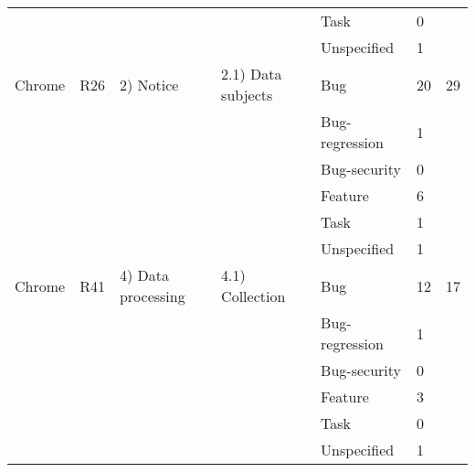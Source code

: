 \documentclass{article}
\begin{document}
\begin{table}[ht]
{\begin{tabular}{|l|l|l|l|l|l|l|}
		~ & ~ & ~ & ~ & Task & 0 & ~ \\ 
		~ & ~ & ~ & ~ & Unspecified & 1 & ~ \\ \hline
		Chrome & R26 & 2) Notice & 2.1) Data subjects & Bug & 20 & 29 \\ 
		~ & ~ & ~ & ~ & Bug-regression & 1 & ~ \\ 
		~ & ~ & ~ & ~ & Bug-security & 0 & ~ \\ 
		~ & ~ & ~ & ~ & Feature & 6 & ~ \\ 
		~ & ~ & ~ & ~ & Task & 1 & ~ \\ 
		~ & ~ & ~ & ~ & Unspecified & 1 & ~ \\ \hline
		Chrome & R41 & 4) Data processing & 4.1) Collection & Bug & 12 & 17 \\ 
		~ & ~ & ~ & ~ & Bug-regression & 1 & ~ \\ 
		~ & ~ & ~ & ~ & Bug-security & 0 & ~ \\ 
		~ & ~ & ~ & ~ & Feature & 3 & ~ \\ 
		~ & ~ & ~ & ~ & Task & 0 & ~ \\ 
		~ & ~ & ~ & ~ & Unspecified & 1 & ~ \\ \hline
	\end{tabular}%
}
\end{table}
\end{document}
